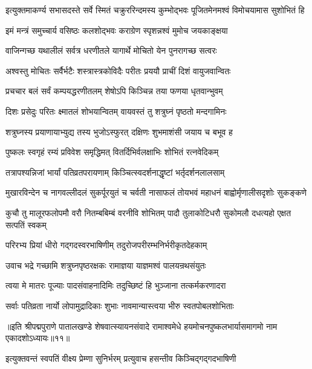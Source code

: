 \twolineshloka
{इत्युक्तमाकर्ण्य सभासदस्ते सर्वे स्मितं चक्रुररिन्दमस्य}
{कुम्भोद्भवः पूजितमेनमश्वं विमोचयामास सुशोभितं हि}%

\twolineshloka
{इमं मन्त्रं समुच्चार्य वसिष्ठः कलशोद्भवः}
{कराग्रेण स्पृशन्नश्वं मुमोच जयकाङ्क्षया}%

\twolineshloka
{वाजिन्गच्छ यथालीलं सर्वत्र धरणीतले}
{यागार्थे मोचितो येन पुनरागच्छ सत्वरः}%

\twolineshloka
{अश्वस्तु मोचितः सर्वैर्भटैः शस्त्रास्त्रकोविदैः}
{परीतः प्रययौ प्राचीं दिशं वायुजवान्वितः}%

\twolineshloka
{प्रचचार बलं सर्वं कम्पयद्धरणीतलम्}
{शेषोऽपि किञ्चिन्न तया फणया धृतवान्भुवम्}%

\twolineshloka
{दिशः प्रसेदुः परितः क्ष्मातलं शोभयान्वितम्}
{वायवस्तं तु शत्रुघ्नं पृष्ठतो मन्दगामिनः}%

\twolineshloka
{शत्रुघ्नस्य प्रयाणायाभ्युद्य तस्य भुजोऽस्फुरत्}
{दक्षिणः शुभमाशंसी जयाय च बभूव ह}%

\twolineshloka
{पुष्कलः स्वगृहं रम्यं प्रविवेश समृद्धिमत्}
{वितर्दिभिर्वलक्षाभिः शोभितं रत्नवेदिकम्}%

\twolineshloka
{तत्रापश्यन्निजां भार्यां पतिव्रतपरायणाम्}
{किञ्चित्स्वदर्शनाद्धृष्टां भर्तृदर्शनलालसाम्}%

\twolineshloka
{मुखारविन्देन च नागवल्लीदलं सुकर्पूरयुतं च चर्वती}
{नासाफलं तोयभवं महाधनं बाह्वोर्मृणालीसदृशोः सुकङ्कणे}%

\twolineshloka
{कुचौ तु मालूरफलोपमौ वरौ नितम्बबिम्बं वरनीवि शोभितम्}
{पादौ तुलाकोटिधरौ सुकोमलौ दधत्यहो एक्षत सत्पतिं स्वकम्}%

\twolineshloka
{परिरभ्य प्रियां धीरो गद्गदस्वरभाषिणीम्}
{तदुरोजपरीरम्भनिर्भरीकृतदेहकाम्}%

\twolineshloka
{उवाच भद्रे गच्छामि शत्रुघ्नपृष्ठरक्षकः}
{रामाज्ञया याज्ञमश्वं पालयन्रथसंयुतः}%

\twolineshloka
{त्वया मे मातरः पूज्याः पादसंवाहनादिमिः}
{तदुच्छिष्टं हि भुञ्जाना तत्कर्मकरणादरा}%

\twolineshloka
{सर्वाः पतिव्रता नार्यो लोपामुद्रादिकाः शुभाः}
{नावमान्यास्त्वया भीरु स्वतपोबलशोभिताः}%

॥इति श्रीपद्मपुराणे पातालखण्डे शेषवात्स्यायनसंवादे रामाश्वमेधे हयमोचनपुष्कलभार्यासमागमो नाम एकादशोऽध्यायः॥११॥



\twolineshloka
{इत्युक्तवन्तं स्वपतिं वीक्ष्य प्रेम्णा सुनिर्भरम्}
{प्रत्युवाच हसन्तीव किञ्चिद्गद्गदभाषिणी}%

